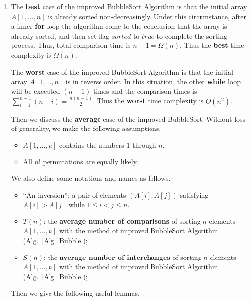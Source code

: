\documentclass[12pt,a4paper]{article}
\makeatletter
\newtheorem*{solution}{Solution}
\theoremstyle{definition}
\renewenvironment{solution}[1][Solution] {\par\pushQED{\qed}\normalfont\topsep6\p@\@plus6\p@\relax\trivlist\item[\hskip\labelsep\bfseries#1\@addpunct{.}]\ignorespaces}{\popQED\endtrivlist\@endpefalse} \makeatother
\makeatother
\begin{document}
\begin{enumerate}
    \begin{solution}
        The \textbf{best} case of the improved BubbleSort Algorithm is that the initial array $A[1,\dots,n]$ is already sorted non-decreasingly. Under this circumstance, after a inner \textbf{for} loop the algorithm come to the conclusion that the array is already sorted, and then set flag $sorted$ to $true$ to complete the sorting process. Thus, total comparison time is $n - 1 = \Omega(n)$. Thus the \textbf{best} time complexity is $\Omega(n)$.

        The \textbf{worst} case of the improved BubbleSort Algorithm is that the initial array $A[1,\dots,n]$ is in reverse order. In this situation, the other \textbf{while} loop will be executed $(n-1)$ times and the comparison times is $\sum_{i=1}^{n-1} (n-i) = \frac{n(n-1)}{2}$. Thus the \textbf{worst} time complexity is $O(n^2)$.

        Then we discuss the \textbf{average} case of the improved BubbleSort. Without loss of generality, we make the following assumptions.

        \begin{itemize}
            \item $A[1,\dots,n]$ contains the numbers $1$ through $n$.
            \item All $n!$ permutations are equally likely.
        \end{itemize}

        We also define some notations and names as follows.

        \begin{itemize}
        \item ``An inversion'': a pair of elements $(A[i], A[j])$ satisfying $A[i] > A[j]$ while $1 \leq i < j \leq n$.
        \item $T(n)$: the \textbf{average number of comparisons} of sorting $n$ elements $A[1,\dots,n]$ with the method of improved BubbleSort Algorithm (Alg.~\ref{Alg_Bubble});
        \item $S(n)$: the \textbf{average number of interchanges} of sorting $n$ elements $A[1,\dots,n]$ with the method of improved BubbleSort Algorithm (Alg.~\ref{Alg_Bubble});
        \end{itemize}

        Then we give the following useful lemmas.


\end{solution}
\end{enumerate}
\end{document}
